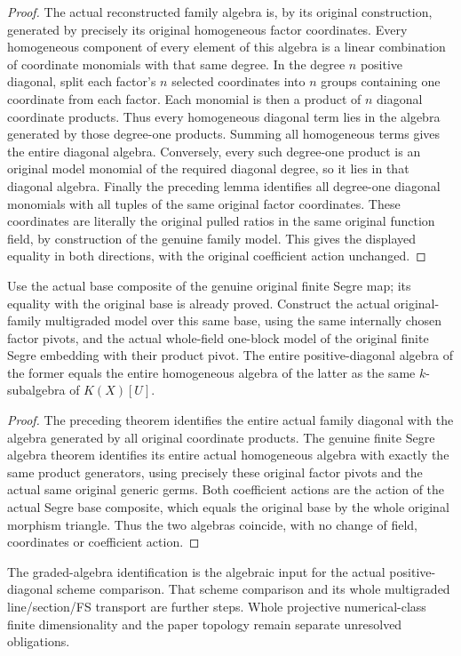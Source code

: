 \begin{proof}
The actual reconstructed family algebra is, by its original construction,
generated by precisely its original homogeneous factor coordinates.
Every homogeneous component of every element of this algebra is a linear
combination of coordinate monomials with that same degree. In the degree
$n$ positive diagonal, split each factor's $n$ selected coordinates into
$n$ groups containing one coordinate from each factor. Each monomial is
then a product of $n$ diagonal coordinate products. Thus every homogeneous
diagonal term lies in the algebra generated by those degree-one products.
Summing all homogeneous terms gives the entire diagonal algebra. Conversely,
every such degree-one product is an original model monomial of the required
diagonal degree, so it lies in that diagonal algebra. Finally the preceding
lemma identifies all degree-one diagonal monomials with all tuples of the
same original factor coordinates. These coordinates are literally the
original pulled ratios in the same original function field, by construction
of the genuine family model. This gives the displayed equality in both
directions, with the original coefficient action unchanged.
\end{proof}
\begin{theorem}
\label{thm:actual-original-positive-diagonal-segre-algebra}
\leanok
{}
Use the actual base composite of the genuine original finite Segre map;
its equality with the original base is already proved. Construct the
actual original-family multigraded model over this same base, using the
same internally chosen factor pivots, and the actual whole-field one-block
model of the original finite Segre embedding with their product pivot.
The entire positive-diagonal algebra of the former equals the entire
homogeneous algebra of the latter as the same $k$-subalgebra of $K(X)[U]$.
\end{theorem}
\begin{proof}
The preceding theorem identifies the entire actual family diagonal with
the algebra generated by all original coordinate products. The genuine
finite Segre algebra theorem identifies its entire actual homogeneous
algebra with exactly the same product generators, using precisely these
original factor pivots and the actual same original generic germs. Both
coefficient actions are the action of the actual Segre base composite,
which equals the original base by the whole original morphism triangle.
Thus the two algebras coincide, with no change of field, coordinates or
coefficient action.
\end{proof}
The graded-algebra identification is the algebraic input for the actual
positive-diagonal scheme comparison. That scheme comparison and its
whole multigraded line/section/FS transport are further steps. Whole
projective numerical-class finite dimensionality and the paper topology
remain separate unresolved obligations.
